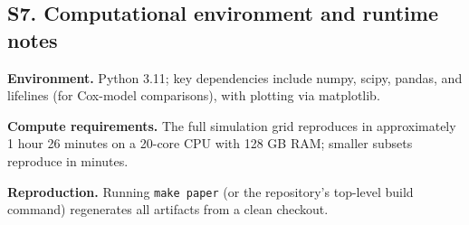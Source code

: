 \documentclass[
]{article}
\begin{document}
\subsection{S7. Computational environment and runtime
notes}\label{s7.-computational-environment-and-runtime-notes}

\textbf{Environment.} Python 3.11; key dependencies include numpy,
scipy, pandas, and lifelines (for Cox-model comparisons), with plotting
via matplotlib.

\textbf{Compute requirements.} The full simulation grid reproduces in
approximately 1 hour 26 minutes on a 20-core CPU with 128 GB RAM;
smaller subsets reproduce in minutes.

\textbf{Reproduction.} Running \texttt{make\ paper} (or the repository's
top-level build command) regenerates all artifacts from a clean
checkout.
\end{document}
